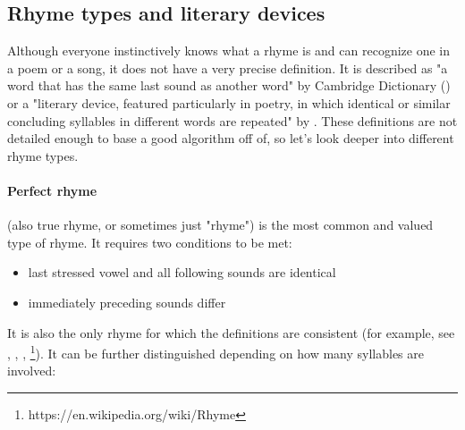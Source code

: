 \subsection{Rhyme types and literary devices}
Although everyone instinctively knows what a rhyme is and can recognize one in a poem or a song, it does not have a very precise definition. It is described as "a word that has the same last sound as another word" by Cambridge Dictionary (\cite{walter2008cambridge}) or a "literary device, featured particularly in poetry, in which identical or similar concluding syllables in different words are repeated" by \cite{literarydevices2020}. These definitions are not detailed enough to base a good algorithm off of, so let's look deeper into different rhyme types.

\paragraph{Perfect rhyme} (also true rhyme, or sometimes just "rhyme") is the most common and valued  type of rhyme. It requires two conditions to be met:

\begin{itemize}
	\item last stressed vowel and all following sounds are identical
	\item immediately preceding sounds differ
\end{itemize}

It is also the only rhyme for which the definitions are consistent (for example, see \cite{bain1867manual}, \cite{vanphonological}, \cite{bergman2017litcharts}, \footnote{https://en.wikipedia.org/wiki/Rhyme}). It can be further distinguished depending on how many syllables are involved:

